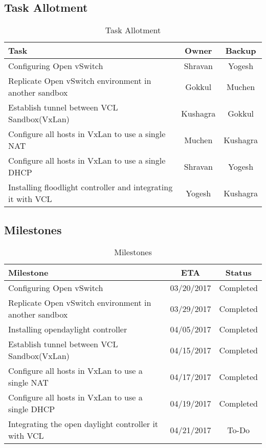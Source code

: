 \documentclass[12pt]{extarticle}
\begin{document}
\subsection{Task Allotment}


\begin{center}
\begin{table}[H]
 \begin{tabular}{||l | c | c ||} 
 \hline
 Task & Owner & Backup \\ [2ex] 
 \hline\hline
  Configuring Open vSwitch & Shravan & Yogesh  \\
  \hline
  Replicate Open vSwitch environment in another sandbox & Gokkul & Muchen  \\ 
  \hline
  Establish tunnel between VCL Sandbox(VxLan) & Kushagra & Gokkul  \\ 
  \hline
  Configure all hosts in VxLan to use a single NAT & Muchen & Kushagra  \\ 
  \hline
  Configure all hosts in VxLan to use a single DHCP & Shravan & Yogesh  \\ 
  \hline
  Installing floodlight controller and integrating it with VCL & Yogesh & Kushagra  \\ 
 \hline
 \end{tabular}

\caption{Task Allotment}
\label{table:task}
\end{table}
\end{center}

\subsection{Milestones}
\begin{center}
\begin{table}[H]
 \begin{tabular}{||l | c | c ||} 
 \hline
 Milestone & ETA & Status \\ [2ex] 
 \hline\hline
  Configuring Open vSwitch & 03/20/2017 & Completed  \\
\hline
  Replicate Open vSwitch environment in another sandbox & 03/29/2017 & Completed  \\
  
   \hline
  Installing opendaylight controller  & 04/05/2017 & Completed  \\ 
  \hline
  Establish tunnel between VCL Sandbox(VxLan) & 04/15/2017 & Completed  \\ 
 
  \hline
  Configure all hosts in VxLan to use a single NAT & 04/17/2017 & Completed  \\ 
  \hline
  Configure all hosts in VxLan to use a single DHCP & 04/19/2017 & Completed  \\ 
  \hline
   Integrating the open daylight controller it with VCL & 04/21/2017 & To-Do  \\ 
 \hline
 \end{tabular}
\caption{Milestones}
\label{table:milestone}
\end{table}
\end{center}
\end{document}
